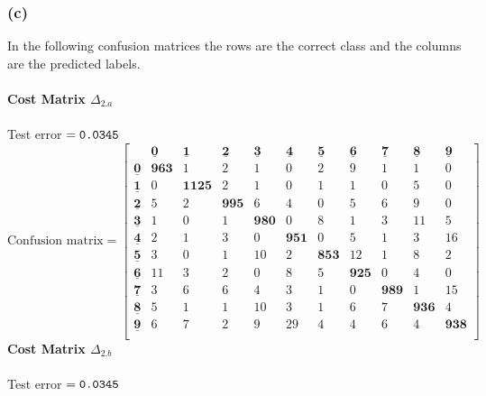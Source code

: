\documentclass[11pt, oneside]{article}   	%
\begin{document}
\newpage{}
\subsubsection{(c)}
In the following confusion matrices the rows are the correct class and the columns are the predicted labels.\\\\
\textbf{Cost Matrix $\Delta_{2.a}$} \\\\
Test error $= \verb!0.0345!$
 \[
  \text{Confusion matrix} =
  \left[ {\begin{array}{ccccccccccc}
   & \underline{\textbf{0}} & \underline{\textbf{1}} & \underline{\textbf{2}} & \underline{\textbf{3}} & \underline{\textbf{4}} & \underline{\textbf{5}} & \underline{\textbf{6}} & \underline{\textbf{7}} & \underline{\textbf{8}} & \underline{\textbf{9}}\\
   \underline{\textbf{0}} & \textbf{963} & 1 & 2 & 1 & 0 & 2 & 9 & 1 & 1 & 0\\
   \underline{\textbf{1}} & 0 & \textbf{1125} & 2 & 1 & 0 & 1 & 1 & 0 & 5 & 0\\
   \underline{\textbf{2}} & 5 & 2 & \textbf{995} & 6 & 4 & 0 & 5 & 6 & 9 & 0\\
   \underline{\textbf{3}} & 1 & 0 & 1 & \textbf{980} & 0 & 8 & 1 & 3 & 11 & 5\\
   \underline{\textbf{4}} & 2 & 1 & 3 & 0 & \textbf{951} & 0 & 5 & 1 & 3 & 16\\
   \underline{\textbf{5}} & 3 & 0 & 1 & 10 & 2 & \textbf{853} & 12 & 1 & 8 & 2\\
   \underline{\textbf{6}} & 11 & 3 & 2 & 0 & 8 & 5 & \textbf{925} & 0 & 4 & 0\\
   \underline{\textbf{7}} & 3 & 6 & 6 & 4 & 3 & 1 & 0 & \textbf{989} & 1 & 15\\
   \underline{\textbf{8}} & 5 & 1 & 1 & 10 & 3 & 1 & 6 & 7 & \textbf{936} & 4\\
   \underline{\textbf{9}} & 6 & 7 & 2 & 9 & 29 & 4 & 4 & 6 & 4 & \textbf{938}\\
  \end{array} } \right]
\]
\textbf{Cost Matrix $\Delta_{2.b}$}\\\\
Test error $= \verb!0.0345!$
\end{document}
